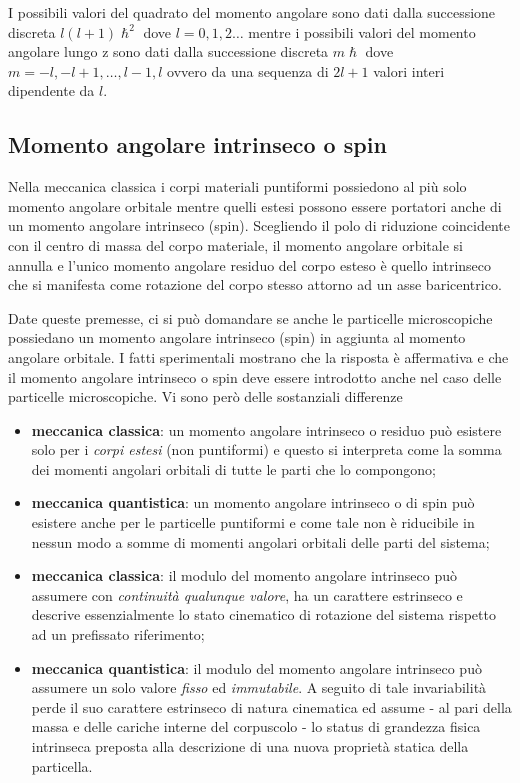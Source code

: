I possibili valori del quadrato del momento angolare sono dati dalla
successione discreta \(l(l+1) \hslash^{2}\) dove \(l=0,1,2 \dots\)
mentre i possibili valori del momento angolare lungo z sono dati dalla
successione discreta \(m \hslash\) dove
\(m = -l, -l + 1, \dots, l-1, l\) ovvero da una sequenza di \(2l+1\)
valori interi dipendente da \(l\).

\subsection{Momento angolare intrinseco o spin}\label{sec:momento-angolare-intrinseco-o-spin}

Nella meccanica classica i corpi materiali puntiformi possiedono al più
solo momento angolare orbitale mentre quelli estesi possono essere
portatori anche di un momento angolare intrinseco (spin).
Scegliendo il
polo di riduzione coincidente con il centro di massa del corpo
materiale, il momento angolare orbitale si annulla e l'unico momento
angolare residuo del corpo esteso è quello intrinseco che si manifesta
come rotazione del corpo stesso attorno ad un asse baricentrico.

Date queste premesse, ci si può domandare se anche le particelle
microscopiche possiedano un momento angolare intrinseco (spin) in
aggiunta al momento angolare orbitale.
I fatti sperimentali mostrano che
la risposta è affermativa e che il momento angolare intrinseco o spin
deve essere introdotto anche nel caso delle particelle microscopiche.
Vi
sono però delle sostanziali differenze

\begin{itemize}
	\tightlist
	\item
	      \textbf{meccanica classica}: un momento angolare intrinseco o residuo
	      può esistere solo per i \emph{corpi estesi} (non puntiformi) e questo
	      si interpreta come la somma dei momenti angolari orbitali di tutte le
	      parti che lo compongono;
	\item
	      \textbf{meccanica quantistica}: un momento angolare intrinseco o di
	      spin può esistere anche per le particelle puntiformi e come tale non è
	      riducibile in nessun modo a somme di momenti angolari orbitali delle
	      parti del sistema;
	\item
	      \textbf{meccanica classica}: il modulo del momento angolare intrinseco
	      può assumere con \emph{continuità qualunque valore}, ha un carattere
	      estrinseco e descrive essenzialmente lo stato cinematico di rotazione
	      del sistema rispetto ad un prefissato riferimento;
	\item
	      \textbf{meccanica quantistica}: il modulo del momento angolare
	      intrinseco può assumere un solo valore \emph{fisso} ed
	      \emph{immutabile}.
	      A seguito di tale invariabilità perde il suo
	      carattere estrinseco di natura cinematica ed assume - al pari della
	      massa e delle cariche interne del corpuscolo - lo status di grandezza
	      fisica intrinseca preposta alla descrizione di una nuova proprietà
	      statica della particella.
\end{itemize}

